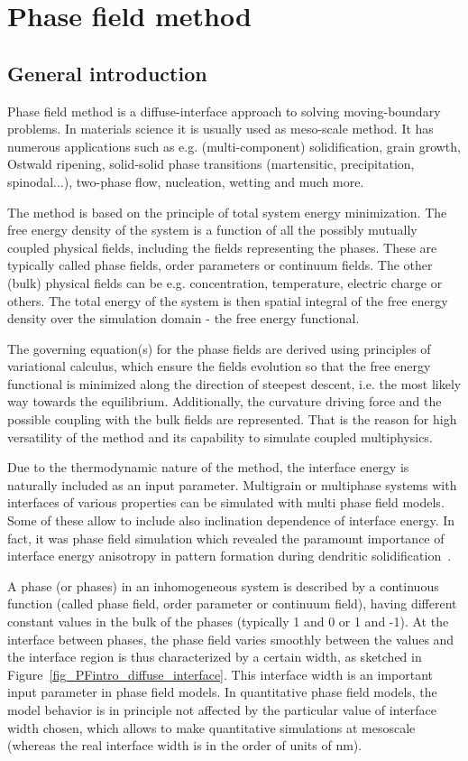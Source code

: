 \chapter{Phase field method} \label{ch_introPF}

\section{General introduction}
Phase field method is a diffuse-interface approach to solving moving-boundary problems. In materials science it is usually used as meso-scale method. It has numerous applications such as e.g. (multi-component) solidification, grain growth, Ostwald ripening, solid-solid phase transitions (martensitic, precipitation, spinodal...), two-phase flow, nucleation, wetting and much more. 

The method is based on the principle of total system energy minimization. The free energy density of the system is a function of all the possibly mutually coupled physical fields, including the fields representing the phases. These are typically called phase fields, order parameters or continuum fields. The other (bulk) physical fields can be e.g. concentration, temperature, electric charge or others. The total energy of the system is then spatial integral of the free energy density over the simulation domain - the free energy functional.

The governing equation(s) for the phase fields are derived using principles of variational calculus, which ensure the fields evolution so that the free energy functional is minimized along the direction of steepest descent, i.e. the most likely way towards the equilibrium. Additionally, the curvature driving force and the possible coupling with the bulk fields are represented. That is the reason for high versatility of the method and its capability to simulate coupled multiphysics. 

Due to the thermodynamic nature of the method, the interface energy is naturally included as an input parameter. Multigrain or multiphase systems with interfaces of various properties can be simulated with multi phase field models. Some of these allow to include also inclination dependence of interface energy. In fact, it was phase field simulation which revealed the paramount importance of interface energy anisotropy in pattern formation during dendritic solidification~\cite{Kobayashi1993}.

A phase (or phases) in an inhomogeneous system is described by a continuous function (called phase field, order parameter or continuum field), having different constant values in the bulk of the phases (typically 1 and 0 or 1 and -1). At the interface between phases, the phase field varies smoothly between the values and the interface region is thus characterized by a certain width, as sketched in Figure~\ref{fig_PFintro_diffuse_interface}. This interface width is an important input parameter in phase field models. In quantitative phase field models, the model behavior is in principle not affected by the particular value of interface width chosen, which allows to make quantitative simulations at mesoscale (whereas the real interface width is in the order of units of nm).

